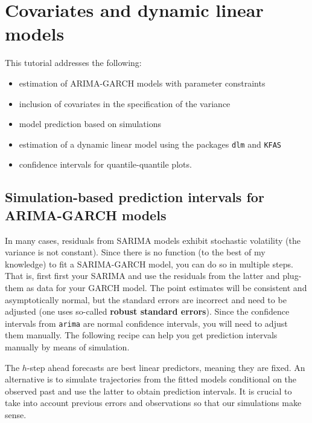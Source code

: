 \documentclass[]{book}
\providecommand{\tightlist}{%
  \setlength{\itemsep}{0pt}\setlength{\parskip}{0pt}}
\begin{document}
\hypertarget{covariates-and-dynamic-linear-models}{%
\chapter{Covariates and dynamic linear models}\label{covariates-and-dynamic-linear-models}}

This tutorial addresses the following:

\begin{itemize}
\tightlist
\item
  estimation of ARIMA-GARCH models with parameter constraints
\item
  inclusion of covariates in the specification of the variance
\item
  model prediction based on simulations
\item
  estimation of a dynamic linear model using the packages \texttt{dlm} and \texttt{KFAS}
\item
  confidence intervals for quantile-quantile plots.
\end{itemize}

\hypertarget{simulation-based-prediction-intervals-for-arima-garch-models}{%
\section{Simulation-based prediction intervals for ARIMA-GARCH models}\label{simulation-based-prediction-intervals-for-arima-garch-models}}

In many cases, residuals from SARIMA models exhibit stochastic volatility (the variance is not constant).
Since there is no function (to the best of my knowledge) to fit a SARIMA-GARCH model, you can do so in multiple steps. That is, first first your SARIMA and use the residuals from the latter and plug-them as data for your GARCH model. The point estimates will be consistent and asymptotically normal, but the standard errors are incorrect and need to be adjusted (one uses so-called \textbf{robust standard errors}). Since the confidence intervals from \texttt{arima} are normal confidence intervals, you will need to adjust them manually. The following recipe can help you get prediction intervals manually by means of simulation.

The \(h\)-step ahead forecasts are best linear predictors, meaning they are fixed. An alternative is to simulate trajectories from the fitted models conditional on the observed past and use the latter to obtain prediction intervals. It is crucial to take into account previous errors and observations so that our simulations make sense.
\end{document}
